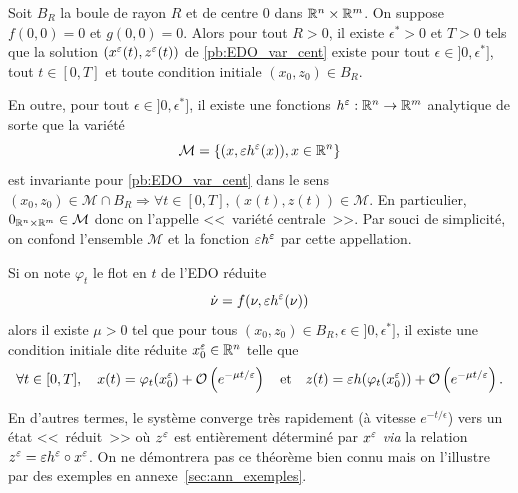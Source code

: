 \begin{theorem} \label{thm:var_cent} 
Soit $B_R$ la boule de rayon $R$ et de centre $0$ dans $\mathbb{R}^n\times\mathbb{R}^m$. 
On suppose $f(0,0) = 0$ et $g(0,0) = 0$. 
Alors pour tout $R>0$, il existe $\epsilon^* > 0$ et $T>0$ tels que la solution $(x^{\varepsilon}(t),z^{\varepsilon}(t))$ de \eqref{pb:EDO_var_cent} existe pour tout $\epsilon\in]0,\epsilon^*]$, tout $t\in[0,T]$ et toute condition initiale $(x_0,z_0)\in B_R$. 

En outre, pour tout $\epsilon\in]0,\epsilon^*]$, il existe 
une fonctions $h^{\varepsilon}:\mathbb{R}^n\rightarrow\mathbb{R}^m$ analytique de sorte que la variété 
$$ \mathcal{M} = \{(x,\varepsilon h^{\varepsilon}(x)), x\in\mathbb{R}^n\} $$
est invariante pour \eqref{pb:EDO_var_cent} dans le sens $(x_0,z_0)\in\mathcal{M}\cap B_R \Rightarrow \forall t\in[0,T], (x(t),z(t)) \in \mathcal{M}$. 
En particulier, $0_{\mathbb{R}^n\times\mathbb{R}^m}\in\mathcal{M}$ donc on l'appelle <<~variété centrale~>>. 
Par souci de simplicité, on confond l'ensemble $\mathcal{M}$ et la fonction $\varepsilon h^{\varepsilon}$ par cette appellation. 

Si on note $\varphi_t$ le flot en $t$ de l'EDO réduite 
\begin{equation} \label{eq:EDO_reduite}
\dot{\nu} = f(\nu,\varepsilon h^{\varepsilon}(\nu))
\end{equation}
alors il existe $\mu > 0$ tel que pour tous $(x_0,z_0)\in B_R, \epsilon\in]0,\epsilon^*]$, 
il existe une condition initiale dite réduite $x_0^{\varepsilon} \in\mathbb{R}^n$ telle que 
$$ \forall t\in[0,T], \quad x(t) = \varphi_t(x_0^{\varepsilon}) + \mathcal{O}\left(e^{-\mu t/\varepsilon}\right) \quad\text{et}\quad z(t) = \varepsilon h(\varphi_t(x_0^{\varepsilon})) + \mathcal{O}\left( e^{-\mu t/\varepsilon}\right). $$
\end{theorem}

En d'autres termes, le système converge très rapidement (à vitesse $e^{-t/\epsilon}$) vers un état <<~réduit~>> où $z^{\varepsilon}$ est entièrement déterminé par $x^{\varepsilon}$ \textit{via} la relation $z^{\varepsilon} = \varepsilon h^{\varepsilon} \circ x^{\varepsilon}$. 
On ne démontrera pas ce théorème bien connu mais on l'illustre par des exemples en annexe~\ref{sec:ann_exemples}. 

